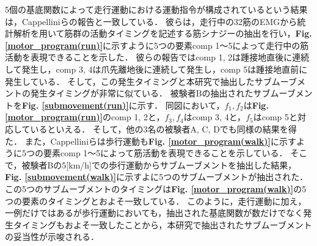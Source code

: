 5個の基底関数によって走行運動における運動指令が構成されているという結果は，Cappelliniらの報告と一致している\cite{Cappellini2006}．
彼らは，走行中の32筋のEMGから統計解析を用いて筋群の活動タイミングを記述する筋シナジーの抽出を行い，{\bf Fig. \ref{motor_program(run)}}に示すように5つの要素comp 1～5によって走行中の筋活動を表現できることを示した．
彼らの報告ではcomp 1, 2は踵接地直後に連続して発生し，comp 3, 4は爪先離地後に連続して発生し，comp 5は踵接地直前に発生している．
そして，この発生タイミングと本研究で抽出したサブムーブメントの発生タイミングが非常に似ている．
被験者Bの抽出されたサブムーブメントを{\bf Fig. \ref{submovement(run)}}に示す．
同図において，$f_1,f_2$は{\bf Fig. \ref{motor_program(run)}}のcomp 1, 2と，$f_3,f_4$はcomp 3, 4と，$f_5$はcomp 5と対応しているといえる．
そして，他の3名の被験者A, C, Dでも同様の結果を得た．
また，Cappelliniらは歩行運動も{\bf Fig. \ref{motor_program(walk)}}に示すように5つの要素comp 1～5によって筋活動を表現できることを示している\cite{Cappellini2006}．
そこで，被験者Bの5[km/h]での歩行運動からサブムーブメントを抽出した結果，{\bf Fig. \ref{submovement(walk)}}に示すよに5つのサブムーブメントが抽出された．
この5つのサブムーブメントのタイミングは{\bf Fig. \ref{motor_program(walk)}}の5つの要素のタイミングとおよそ一致している．
このように，走行運動に加え，一例だけではあるが歩行運動においても，抽出された基底関数が数だけでなく発生タイミングもおよそ一致したことから，本研究で抽出されたサブムーブメントの妥当性が示唆される．

